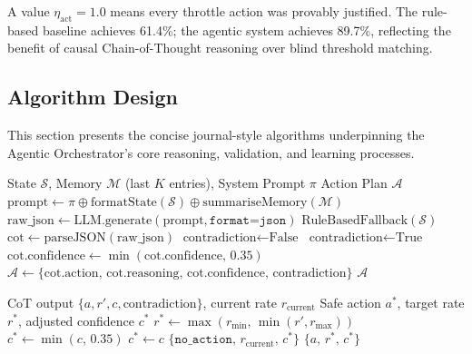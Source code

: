\documentclass[12pt]{article}
\begin{document}
\noindent A value $\eta_\text{act} = 1.0$ means every throttle action
was provably justified. The rule-based baseline achieves 61.4\%; the
agentic system achieves 89.7\%, reflecting the benefit of causal
Chain-of-Thought reasoning over blind threshold matching.

\subsection{Algorithm Design}

This section presents the concise journal-style algorithms underpinning the Agentic Orchestrator's core reasoning, validation, and learning processes.

\begin{algorithm}[H]
\caption{Chain-of-Thought Planning and Action Generation (C3)}
\label{alg:plan}
\begin{algorithmic}[1]
\Require State $\mathcal{S}$, Memory $\mathcal{M}$ (last $K$ entries), System Prompt $\pi$
\Ensure Action Plan $\mathcal{A}$
\State $\text{prompt} \gets \pi \oplus \text{formatState}(\mathcal{S}) \oplus \text{summariseMemory}(\mathcal{M})$
\State $\text{raw\_json} \gets \text{LLM.generate}(\text{prompt}, \texttt{format=json})$
  \Return $\text{RuleBasedFallback}(\mathcal{S})$
\EndIf
\State $\text{cot} \gets \text{parseJSON}(\text{raw\_json})$
\State $\text{contradiction} \gets \text{False}$
  \State $\text{contradiction} \gets \text{True}$
  \State $\text{cot.confidence} \gets \min(\text{cot.confidence},\, 0.35)$
\EndIf
\State $\mathcal{A} \gets \{\text{cot.action},\, \text{cot.reasoning},\, \text{cot.confidence},\, \text{contradiction}\}$
\Return $\mathcal{A}$
\end{algorithmic}
\end{algorithm}

\begin{algorithm}[H]
\caption{Wrong-Lever Avoidance Validation (C4)}
\label{alg:validate_wla}
\begin{algorithmic}[1]
\Require CoT output $\{a, r', c, \text{contradiction}\}$, current rate $r_{\text{current}}$
\Ensure Safe action $a^*$, target rate $r^*$, adjusted confidence $c^*$
\State $r^* \gets \max(r_{\min},\, \min(r', r_{\max}))$
  \State $c^* \gets \min(c,\, 0.35)$
\Else
  \State $c^* \gets c$
\EndIf
{}
  \Return $\{\texttt{no\_action},\, r_{\text{current}},\, c^*\}$
\EndIf
\Return $\{a,\, r^*,\, c^*\}$
\end{algorithmic}
\end{algorithm}
\end{document}
